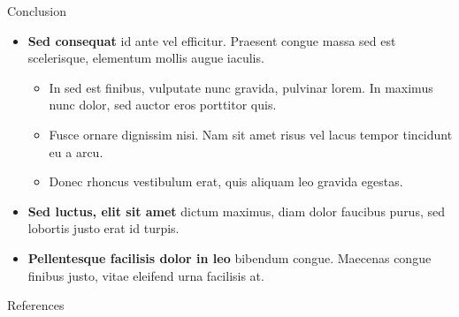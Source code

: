 \documentclass[final]{beamer}
\newlength{\colwidth}
\begin{document}
\begin{frame}[t]
\begin{columns}[t]
\begin{column}{\colwidth}
\begin{block}{Conclusion}
    \begin{itemize}
      \item \textbf{Sed consequat} id ante vel efficitur. Praesent congue massa
        sed est scelerisque, elementum mollis augue iaculis.
        \begin{itemize}
          \item In sed est finibus, vulputate
            nunc gravida, pulvinar lorem. In maximus nunc dolor, sed auctor eros
            porttitor quis.
          \item Fusce ornare dignissim nisi. Nam sit amet risus vel lacus
            tempor tincidunt eu a arcu.
          \item Donec rhoncus vestibulum erat, quis aliquam leo
            gravida egestas.
        \end{itemize}
      \item \textbf{Sed luctus, elit sit amet} dictum maximus, diam dolor
        faucibus purus, sed lobortis justo erat id turpis.
      \item \textbf{Pellentesque facilisis dolor in leo} bibendum congue.
        Maecenas congue finibus justo, vitae eleifend urna facilisis at.
    \end{itemize}

  \end{block}

  \begin{block}{References}
    \nocite{*}
    

  \end{block}

\end{column}

\end{columns}
\end{frame}
\end{document}
